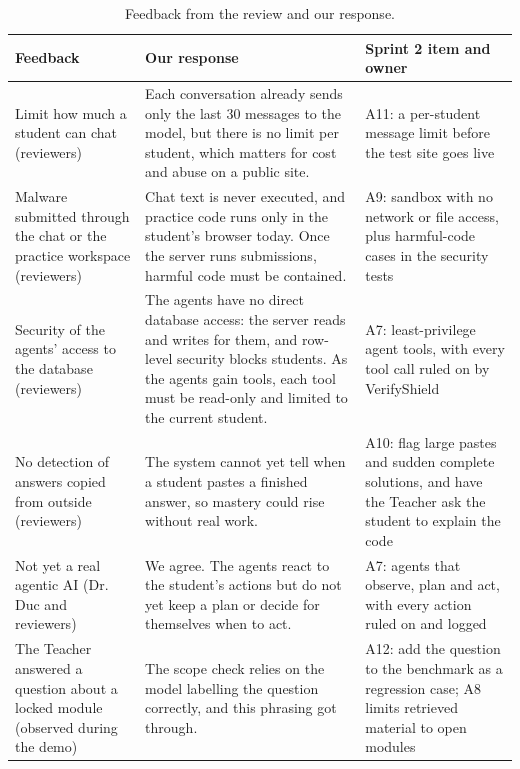 \documentclass[11pt,a4paper]{article}
\begin{document}
{\small
\begin{longtable}{>{\raggedright\arraybackslash}p{}>{\raggedright\arraybackslash}p{}>{\raggedright\arraybackslash}p{}}
\caption{Feedback from the review and our response.}\\
\toprule
\textbf{Feedback} & \textbf{Our response} & \textbf{Sprint 2 item and owner} \\
\midrule
\endhead
Limit how much a student can chat (reviewers) & Each conversation already sends only the last 30 messages to the model, but there is no limit per student, which matters for cost and abuse on a public site. & A11: a per-student message limit before the test site goes live \\
Malware submitted through the chat or the practice workspace (reviewers) & Chat text is never executed, and practice code runs only in the student's browser today. Once the server runs submissions, harmful code must be contained. & A9: sandbox with no network or file access, plus harmful-code cases in the security tests \\
Security of the agents' access to the database (reviewers) & The agents have no direct database access: the server reads and writes for them, and row-level security blocks students. As the agents gain tools, each tool must be read-only and limited to the current student. & A7: least-privilege agent tools, with every tool call ruled on by VerifyShield \\
No detection of answers copied from outside (reviewers) & The system cannot yet tell when a student pastes a finished answer, so mastery could rise without real work. & A10: flag large pastes and sudden complete solutions, and have the Teacher ask the student to explain the code \\
Not yet a real agentic AI (Dr. Duc and reviewers) & We agree. The agents react to the student's actions but do not yet keep a plan or decide for themselves when to act. & A7: agents that observe, plan and act, with every action ruled on and logged \\
The Teacher answered a question about a locked module (observed during the demo) & The scope check relies on the model labelling the question correctly, and this phrasing got through. & A12: add the question to the benchmark as a regression case; A8 limits retrieved material to open modules \\
\bottomrule
\end{longtable}}
\end{document}
